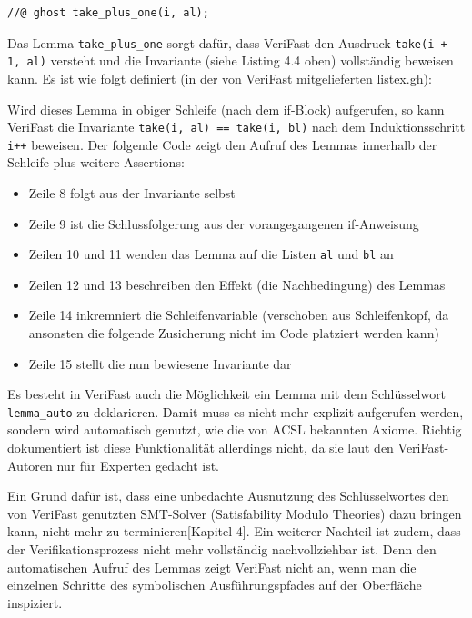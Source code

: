 \lstset{frame=none}                      
\begin{lstlisting}
//@ ghost take_plus_one(i, al);
\end{lstlisting}
\lstset{frame=single}    
Das Lemma \lstinline{take_plus_one} sorgt dafür, dass VeriFast den Ausdruck \lstinline{take(i + 1, al)}
versteht und die Invariante (siehe Listing 4.4 oben) vollständig beweisen kann. Es ist wie folgt
definiert (in der von VeriFast mitgelieferten listex.gh):
\begin{figure}[H]

\end{figure}
Wird dieses Lemma in obiger Schleife (nach dem if-Block) aufgerufen, so kann VeriFast
die Invariante \lstinline{take(i, al) == take(i, bl)} nach dem Induktionsschritt \lstinline{i++}
beweisen. Der folgende Code zeigt den Aufruf des Lemmas innerhalb der Schleife plus weitere Assertions:
\begin{itemize}
\item Zeile 8 folgt aus der Invariante selbst
\item Zeile 9 ist die Schlussfolgerung aus der vorangegangenen if-Anweisung
\item Zeilen 10 und 11 wenden das Lemma auf die Listen \lstinline{al} und \lstinline{bl} an
\item Zeilen 12 und 13 beschreiben den Effekt (die Nachbedingung) des Lemmas
\item Zeile 14 inkremniert die Schleifenvariable (verschoben aus Schleifenkopf, da ansonsten die folgende Zusicherung nicht im Code platziert werden kann)
\item Zeile 15 stellt die nun bewiesene Invariante dar
\end{itemize}



Es besteht in VeriFast auch die Möglichkeit ein Lemma mit dem Schlüsselwort \lstinline{lemma_auto} zu deklarieren.
Damit muss es nicht mehr explizit aufgerufen werden, sondern wird automatisch genutzt, wie die von 
ACSL bekannten Axiome. Richtig dokumentiert ist diese Funktionalität allerdings nicht, da sie laut den VeriFast-Autoren
nur für Experten gedacht ist.

Ein Grund dafür ist, dass eine unbedachte Ausnutzung des Schlüsselwortes den von VeriFast genutzten 
SMT-Solver (Satisfability Modulo Theories) dazu bringen kann, nicht mehr zu terminieren\cite{jacobs-2010}[Kapitel 4]. Ein
weiterer Nachteil ist zudem, dass der Verifikationsprozess nicht mehr vollständig nachvollziehbar ist.
Denn den automatischen Aufruf des Lemmas zeigt VeriFast nicht an, wenn man die einzelnen
Schritte des symbolischen Ausführungspfades auf der Oberfläche inspiziert.

